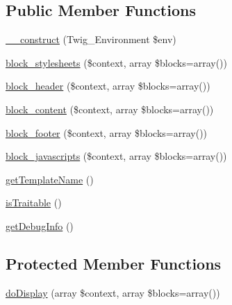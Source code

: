 \subsection*{Public Member Functions}
\begin{DoxyCompactItemize}
\item 
\hyperlink{class_____twig_template__f20d8a2c84b0fe5a9e7535a8b0f7d017_a4f8326243132c1450a81e0a817aa1be7}{\-\_\-\-\_\-construct} (Twig\-\_\-\-Environment \$env)
\item 
\hyperlink{class_____twig_template__f20d8a2c84b0fe5a9e7535a8b0f7d017_affb8c4a88a94dfaf7e41f4e145764703}{block\-\_\-stylesheets} (\$context, array \$blocks=array())
\item 
\hyperlink{class_____twig_template__f20d8a2c84b0fe5a9e7535a8b0f7d017_a339fc7bc2cca23febaa2851465969241}{block\-\_\-header} (\$context, array \$blocks=array())
\item 
\hyperlink{class_____twig_template__f20d8a2c84b0fe5a9e7535a8b0f7d017_a02d2fb3aba77e5afa3a76878c7340893}{block\-\_\-content} (\$context, array \$blocks=array())
\item 
\hyperlink{class_____twig_template__f20d8a2c84b0fe5a9e7535a8b0f7d017_a4e99aa468a91b5ad17e3da5c288764aa}{block\-\_\-footer} (\$context, array \$blocks=array())
\item 
\hyperlink{class_____twig_template__f20d8a2c84b0fe5a9e7535a8b0f7d017_aa7415aa9b3dad8473c723b3f9d93a76a}{block\-\_\-javascripts} (\$context, array \$blocks=array())
\item 
\hyperlink{class_____twig_template__f20d8a2c84b0fe5a9e7535a8b0f7d017_a621a3ccd148ed8b9e937da6959c98f39}{get\-Template\-Name} ()
\item 
\hyperlink{class_____twig_template__f20d8a2c84b0fe5a9e7535a8b0f7d017_aa9eb89be270f6afc256ef5e272b78a63}{is\-Traitable} ()
\item 
\hyperlink{class_____twig_template__f20d8a2c84b0fe5a9e7535a8b0f7d017_abd0ecb0136f4228db2bd963bfc1e20d7}{get\-Debug\-Info} ()
\end{DoxyCompactItemize}
\subsection*{Protected Member Functions}
\begin{DoxyCompactItemize}
\item 
\hyperlink{class_____twig_template__f20d8a2c84b0fe5a9e7535a8b0f7d017_adb62b7c226e07d30f836ed16158d924f}{do\-Display} (array \$context, array \$blocks=array())
\end{DoxyCompactItemize}


